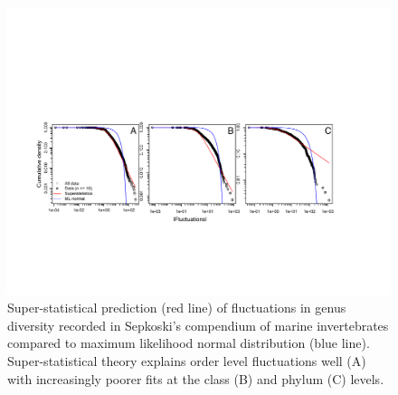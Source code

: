\begin{figure}[!hp]
  \centering
  \includegraphics[scale=0.6]{figs/figSupp_sepk_Px.pdf}
  \caption[Super-statistical prediction for Sepkoski's
  compendium]{Super-statistical prediction (red line) of fluctuations
    in genus diversity recorded in Sepkoski's compendium of marine
    invertebrates compared to maximum likelihood normal distribution
    (blue line). Super-statistical theory explains order level
    fluctuations well (A) with increasingly poorer fits at the class
    (B) and phylum (C) levels.}
  \label{fig:supp_sepkPx}
\end{figure}

